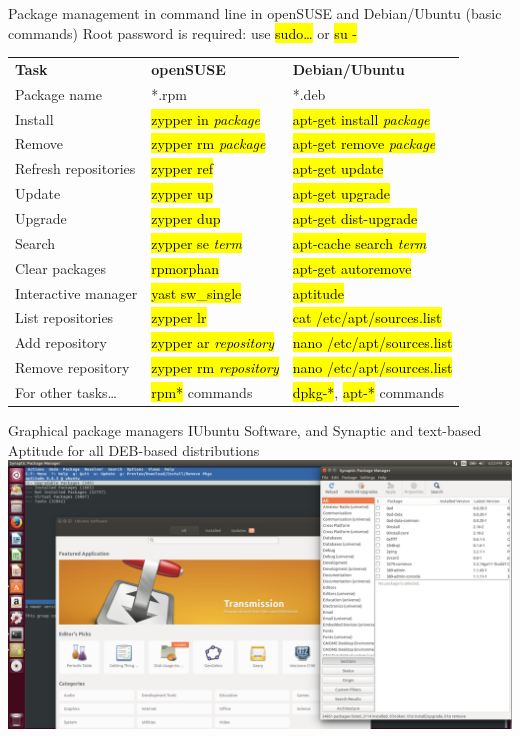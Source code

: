 \documentclass[compress, ucs, xelatex, 11pt, xcolor=svgnames,
  hyperref={
    bookmarks=true,
    unicode=true,
    colorlinks=true,
    pdftitle={Linux, command line and MetaCentrum},
    plainpages=false,
    pdfauthor={Vojtech Zeisek},
    pdfsubject={Course about use of Linux command line, writing shell scripts and using MetaCentrum of CESNET},
    pdfcreator={XeLaTeX},
    pdfkeywords={Linux, GNU, BASH, shell, command line, MetaCentrum},
    linkcolor=DarkRed,
    anchorcolor=DarkBlue,
    citecolor=Indigo,
    filecolor=NavyBlue,
    menucolor=DarkMagenta,
    urlcolor=DarkBlue,
    pdftex},
  url={hyphens, lowtilde} %
  ]{beamer}
\renewcommand{\texttt}[1]{\hl{\ttfamily #1}}
\begin{document}
\begin{frame}{Package management in command line in openSUSE and Debian/Ubuntu (basic commands)} %
  Root password is required: use \texttt{sudo\ldots} or \texttt{su -}
  \begin{center}
    \begin{footnotesize}
      \begin{tabular}{lll}
	\textbf{Task} & \textbf{openSUSE} & \textbf{Debian/Ubuntu}\\
	Package name & *.rpm & *.deb\\
	Install & \texttt{zypper in \textit{package}} & \texttt{apt-get install \textit{package}}\\
	Remove & \texttt{zypper rm \textit{package}} & \texttt{apt-get remove \textit{package}}\\
	Refresh repositories & \texttt{zypper ref} & \texttt{apt-get update}\\
	Update & \texttt{zypper up} & \texttt{apt-get upgrade}\\
	Upgrade & \texttt{zypper dup} & \texttt{apt-get dist-upgrade}\\
	Search & \texttt{zypper se \textit{term}} & \texttt{apt-cache search \textit{term}}\\
	Clear packages & \texttt{rpmorphan} & \texttt{apt-get autoremove}\\
	Interactive manager & \texttt{yast sw\_single} & \texttt{aptitude}\\
	List repositories & \texttt{zypper lr} & \texttt{cat /etc/apt/sources.list}\\
	Add repository & \texttt{zypper ar \textit{repository}} & \texttt{nano /etc/apt/sources.list}\\
	Remove repository & \texttt{zypper rm \textit{repository}} & \texttt{nano /etc/apt/sources.list}\\
	For other tasks\ldots & \texttt{rpm*} commands & \texttt{dpkg-*}, \texttt{apt-*} commands
      \end{tabular}
    \end{footnotesize}
  \end{center}
\end{frame}

\begin{frame}{Graphical package managers I}{Ubuntu Software, and Synaptic and text-based Aptitude for all DEB-based distributions}
  \includegraphics[width=\textwidth]{software_managers_ubuntu_deb.png}
\end{frame}
\end{document}
